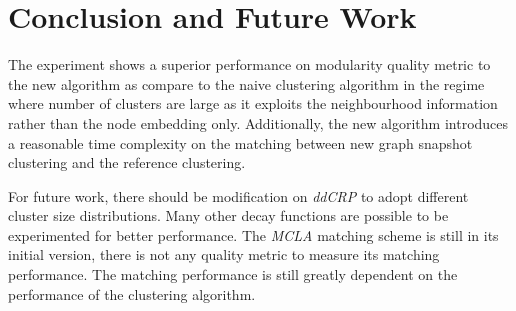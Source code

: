 \chapter{Conclusion and Future Work}

The experiment shows a superior performance on modularity quality metric to the new algorithm as compare to the naive clustering algorithm in the regime where number of clusters are large as it exploits the neighbourhood information rather than the node embedding only. Additionally, the new algorithm introduces a reasonable time complexity on the matching between new graph snapshot clustering and the reference clustering.

For future work, there should be modification on \emph{ddCRP} to adopt different cluster size distributions. Many other decay functions are possible to be experimented for better performance. The \emph{MCLA} matching scheme is still in its initial version, there is not any quality metric to measure its matching performance. The matching performance is still greatly dependent on the performance of the clustering algorithm.